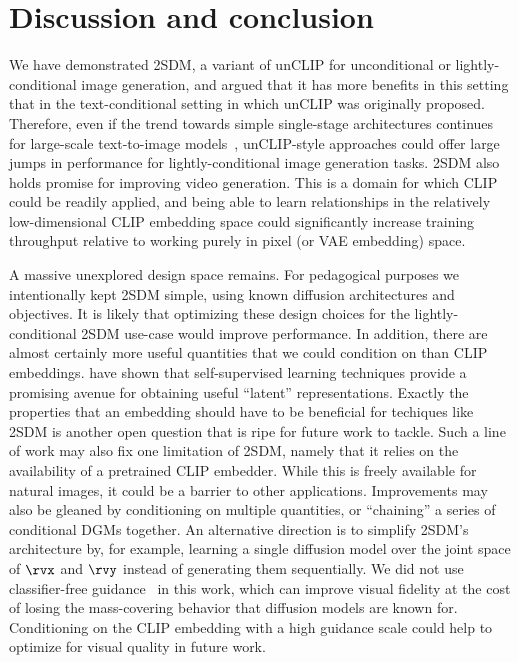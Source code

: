 \section{Discussion and conclusion}
We have demonstrated 2SDM, a variant of unCLIP for unconditional or lightly-conditional image generation, and argued that it has more benefits in this setting that in the text-conditional setting in which unCLIP was originally proposed. Therefore, even if the trend towards simple single-stage architectures continues for large-scale text-to-image models~\citep{rombach2022high,chang2023muse,hoogeboom2023simple}, unCLIP-style approaches could offer large jumps in performance for lightly-conditional image generation tasks.
%
2SDM also holds promise for improving video generation. This is a domain for which CLIP could be readily applied, and being able to learn relationships in the relatively low-dimensional CLIP embedding space could significantly increase training throughput relative to working purely in pixel (or VAE embedding) space.

A massive unexplored design space remains. For pedagogical purposes we intentionally kept 2SDM simple, using known diffusion architectures and objectives. It is likely that optimizing these design choices for the lightly-conditional 2SDM use-case would improve performance. In addition, there are almost certainly more useful quantities that we could condition on than CLIP embeddings. 
%
%
\citet{bao2022conditional,hu2022self} have shown that self-supervised learning techniques provide a promising avenue for obtaining useful ``latent'' representations. Exactly the properties that an embedding should have to be beneficial for techiques like 2SDM is another open question that is ripe for future work to tackle. Such a line of work may also fix one limitation of 2SDM, namely that it relies on the availability of a pretrained CLIP embedder. While this is freely available for natural images, it could be a barrier to other applications. Improvements may also be gleaned by conditioning on multiple quantities, or ``chaining'' a series of conditional DGMs together. An alternative direction is to simplify 2SDM's architecture by, for example, learning a single diffusion model over the joint space of $\rvx$ and $\rvy$ instead of generating them sequentially. 
%
We did not use classifier-free guidance~\citep{ho2022classifier} in this work, which can improve visual fidelity at the cost of losing the mass-covering behavior that diffusion models are known for. Conditioning on the CLIP embedding with a high guidance scale could help to optimize for visual quality in future work.
%


